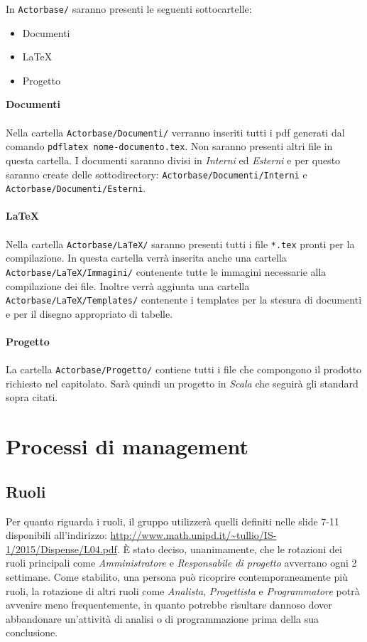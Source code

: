 \documentclass[a4paper]{report}
\begin{document}
				In \verb|Actorbase/| saranno presenti le seguenti sottocartelle:
				\begin{itemize}
					\item Documenti
					\item LaTeX
					\item Progetto
				\end{itemize}
				\textbf{Documenti} \\ \\
				Nella cartella \verb|Actorbase/Documenti/| verranno inseriti tutti i pdf generati dal comando \verb|pdflatex nome-documento.tex|. Non 
				saranno presenti altri file in questa cartella. I documenti saranno divisi in \emph{Interni} ed \emph{Esterni} e per questo saranno create
				delle sottodirectory: \verb|Actorbase/Documenti/Interni| e\\  \verb|Actorbase/Documenti/Esterni|. \\ \\
				\textbf{LaTeX} \\ \\
				Nella cartella \verb|Actorbase/LaTeX/| saranno presenti tutti i file \verb|*.tex| pronti per la compilazione. In questa cartella verrà inserita
				anche una cartella\\ \verb|Actorbase/LaTeX/Immagini/| contenente tutte le immagini necessarie alla compilazione dei file.
				Inoltre verrà aggiunta una cartella \verb|Actorbase/LaTeX/Templates/| contenente i templates per la stesura di documenti e per il
				disegno appropriato di tabelle. \\ \\
				\textbf{Progetto} \\ \\
				La cartella \verb|Actorbase/Progetto/| contiene tutti i file che compongono il prodotto richiesto nel capitolato. Sarà quindi un progetto in
				\emph{Scala} che seguirà gli standard sopra citati.
		\section{Processi di management}
			\subsection{Ruoli}
				Per quanto riguarda i ruoli, il gruppo utilizzerà quelli definiti nelle slide 7-11 disponibili all'indirizzo: 
				\url{http://www.math.unipd.it/~tullio/IS-1/2015/Dispense/L04.pdf}. È stato deciso, unanimamente, che le rotazioni dei ruoli principali
				come \emph{Amministratore} e \emph{Responsabile di progetto} avverrano ogni 2 settimane. Come stabilito, una persona può ricoprire
				contemporaneamente più ruoli, la rotazione di altri ruoli come \emph{Analista}, \emph{Progettista} e \emph{Programmatore} potrà avvenire 
				meno frequentemente, in quanto potrebbe risultare dannoso dover abbandonare un'attività di analisi o di programmazione prima della sua 
				conclusione. 
				
\end{document}
